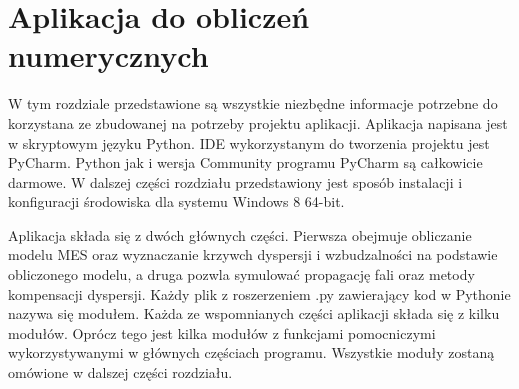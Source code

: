 \chapter{Aplikacja do obliczeń numerycznych}
\label{cha:aplikacja}

W tym rozdziale przedstawione są wszystkie niezbędne informacje potrzebne do korzystana ze zbudowanej na potrzeby projektu aplikacji. Aplikacja napisana jest w skryptowym języku Python. IDE wykorzystanym do tworzenia projektu jest PyCharm. Python jak i wersja Community programu PyCharm są całkowicie darmowe. W dalszej części rozdziału przedstawiony jest sposób instalacji i konfiguracji środowiska dla systemu Windows 8 64-bit.

Aplikacja składa się  z dwóch głównych części. Pierwsza obejmuje obliczanie modelu MES oraz wyznaczanie krzywch dyspersji i wzbudzalności na podstawie obliczonego modelu, a druga pozwla symulować propagację fali oraz metody kompensacji dyspersji. Każdy plik z roszerzeniem .py zawierający kod w Pythonie nazywa się modułem. Każda ze wspomnianych części aplikacji składa się z kilku modułów. Oprócz tego jest kilka modułów z funkcjami pomocniczymi wykorzystywanymi w głównych częściach programu. Wszystkie moduły zostaną omówione w dalszej części rozdziału.
































